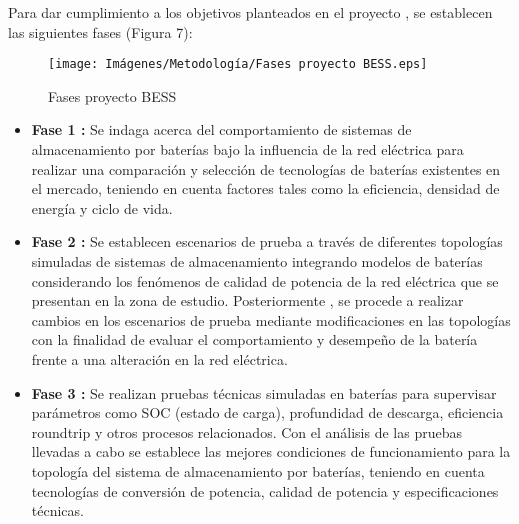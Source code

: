 Para dar cumplimiento a los objetivos planteados en el proyecto , se establecen  las siguientes fases  (Figura 7):

\begin{figure}[h!]
    \begin{center}
    \centering
    \texttt{[image: Imágenes/Metodología/Fases proyecto BESS.eps]}
	\caption{Fases proyecto BESS}
    \end{center}
\end{figure}



\begin{itemize}
    \item 
    \textbf{Fase 1 :} Se indaga acerca del comportamiento  de sistemas de almacenamiento por baterías bajo la influencia de la red eléctrica 
    para realizar una comparación y selección de tecnologías de baterías existentes en el mercado, teniendo en cuenta factores tales como la eficiencia, densidad de energía y ciclo de vida.
    \item 
   \textbf{Fase 2 : }Se establecen escenarios de prueba a través de diferentes topologías simuladas de sistemas de almacenamiento integrando modelos de baterías considerando los fenómenos de calidad de potencia de la red eléctrica que se presentan en la zona de estudio. Posteriormente , se procede a realizar cambios en los escenarios de prueba mediante modificaciones en las topologías con la finalidad de evaluar el comportamiento y desempeño de la batería frente a una alteración en la red eléctrica.
\newpage    
    \item 
    \textbf{Fase 3 : }
    Se realizan pruebas técnicas simuladas en baterías para supervisar parámetros como SOC (estado de carga), profundidad de descarga, eficiencia roundtrip y otros procesos relacionados. Con el análisis de las pruebas llevadas a cabo se establece  las mejores condiciones de funcionamiento para la topología del sistema de almacenamiento por baterías, teniendo en cuenta tecnologías de conversión de potencia, calidad de potencia y especificaciones técnicas.
\end{itemize}

